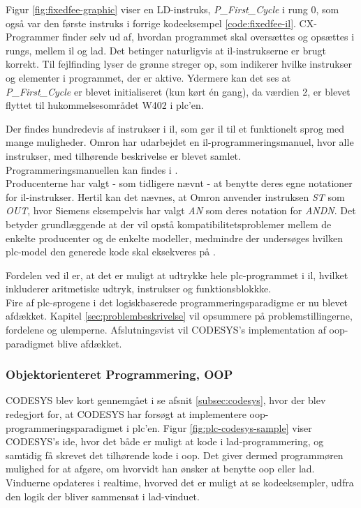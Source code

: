 
\noindent Figur \ref{fig:fixedfee-graphic} viser en LD-instruks, \textit{P\_First\_Cycle} i rung 0, som også var den første instruks i forrige kodeeksempel \ref{code:fixedfee-il}. CX-Programmer finder selv ud af, hvordan programmet skal oversættes og opsættes i rungs, mellem \gls{il} og \gls{lad}. Det betinger naturligvis at \gls{il}-instrukserne er brugt korrekt. 
Til fejlfinding lyser de grønne streger op, som indikerer hvilke instrukser og elementer i programmet, der er aktive. Ydermere kan det ses at \textit{P\_First\_Cycle} er blevet initialiseret (kun kørt én gang), da værdien 2, er blevet flyttet til hukommelsesområdet W402 i \gls{plc}'en.

\noindent Der findes hundredevis af instrukser i \gls{il}, som gør \gls{il} til et funktionelt sprog med mange muligheder. Omron har udarbejdet en \gls{il}-programmeringsmanuel, hvor alle instrukser, med tilhørende beskrivelse er blevet samlet. Programmeringsmanuellen kan findes i \cite{omron-il-manuel}. \\ 

\noindent Producenterne har valgt - som tidligere nævnt - at benytte deres egne notationer for \gls{il}-instrukser. Hertil kan det nævnes, at Omron anvender instruksen \textit{ST} som \textit{OUT}, hvor Siemens eksempelvis har valgt \textit{AN} som deres notation for \textit{ANDN}. Det betyder grundlæggende at der vil opstå kompatibilitetsproblemer mellem de enkelte producenter og de enkelte modeller, medmindre der undersøges hvilken \gls{plc}-model den generede kode skal eksekveres på \cite{FDB_desc}.

\noindent Fordelen ved \gls{il} er, at det er muligt at udtrykke hele \gls{plc}-programmet i \gls{il}, hvilket inkluderer aritmetiske udtryk, instrukser og funktionsblokkke. \\

\noindent Fire af \gls{plc}-sprogene i det logiskbaserede programmeringsparadigme er nu blevet afdækket. Kapitel \ref{sec:problembeskrivelse} vil opsummere på problemstillingerne, fordelene og ulemperne. Afslutningsvist vil CODESYS's implementation af \gls{oop}-paradigmet blive afdækket.

\label{subsec:software_codesys}
\subsubsection{Objektorienteret Programmering, OOP }
\noindent CODESYS blev kort gennemgået i se afsnit \ref{subsec:codesys}, hvor der blev redegjort for, at CODESYS har forsøgt at implementere \gls{oop}-programmeringsparadigmet i \gls{plc}'en. Figur \ref{fig:plc-codesys-sample} viser CODESYS's \gls{ide}, hvor det både er muligt at kode i \gls{lad}-programmering, og samtidig få skrevet det tilhørende kode i \gls{oop}. Det giver dermed programmøren mulighed for at afgøre, om hvorvidt han ønsker at benytte \gls{oop} eller \gls{lad}. Vinduerne opdateres i realtime, hvorved det er muligt at se kodeeksempler, udfra den logik der bliver sammensat i \gls{lad}-vinduet. 

